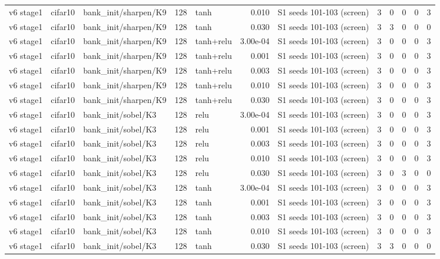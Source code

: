 \begin{table}[htbp]
{\begin{tabular}{@{}lllrlrlrrrrr@{}}
v6 stage1 & cifar10 & bank\_init/sharpen/K9 & 128 & tanh & 0.010 & S1 seeds 101-103 (screen) & 3 & 0 & 0 & 0 & 3 \\
v6 stage1 & cifar10 & bank\_init/sharpen/K9 & 128 & tanh & 0.030 & S1 seeds 101-103 (screen) & 3 & 3 & 0 & 0 & 0 \\
v6 stage1 & cifar10 & bank\_init/sharpen/K9 & 128 & tanh+relu & 3.00e-04 & S1 seeds 101-103 (screen) & 3 & 0 & 0 & 0 & 3 \\
v6 stage1 & cifar10 & bank\_init/sharpen/K9 & 128 & tanh+relu & 0.001 & S1 seeds 101-103 (screen) & 3 & 0 & 0 & 0 & 3 \\
v6 stage1 & cifar10 & bank\_init/sharpen/K9 & 128 & tanh+relu & 0.003 & S1 seeds 101-103 (screen) & 3 & 0 & 0 & 0 & 3 \\
v6 stage1 & cifar10 & bank\_init/sharpen/K9 & 128 & tanh+relu & 0.010 & S1 seeds 101-103 (screen) & 3 & 0 & 0 & 0 & 3 \\
v6 stage1 & cifar10 & bank\_init/sharpen/K9 & 128 & tanh+relu & 0.030 & S1 seeds 101-103 (screen) & 3 & 0 & 0 & 0 & 3 \\
v6 stage1 & cifar10 & bank\_init/sobel/K3 & 128 & relu & 3.00e-04 & S1 seeds 101-103 (screen) & 3 & 0 & 0 & 0 & 3 \\
v6 stage1 & cifar10 & bank\_init/sobel/K3 & 128 & relu & 0.001 & S1 seeds 101-103 (screen) & 3 & 0 & 0 & 0 & 3 \\
v6 stage1 & cifar10 & bank\_init/sobel/K3 & 128 & relu & 0.003 & S1 seeds 101-103 (screen) & 3 & 0 & 0 & 0 & 3 \\
v6 stage1 & cifar10 & bank\_init/sobel/K3 & 128 & relu & 0.010 & S1 seeds 101-103 (screen) & 3 & 0 & 0 & 0 & 3 \\
v6 stage1 & cifar10 & bank\_init/sobel/K3 & 128 & relu & 0.030 & S1 seeds 101-103 (screen) & 3 & 0 & 3 & 0 & 0 \\
v6 stage1 & cifar10 & bank\_init/sobel/K3 & 128 & tanh & 3.00e-04 & S1 seeds 101-103 (screen) & 3 & 0 & 0 & 0 & 3 \\
v6 stage1 & cifar10 & bank\_init/sobel/K3 & 128 & tanh & 0.001 & S1 seeds 101-103 (screen) & 3 & 0 & 0 & 0 & 3 \\
v6 stage1 & cifar10 & bank\_init/sobel/K3 & 128 & tanh & 0.003 & S1 seeds 101-103 (screen) & 3 & 0 & 0 & 0 & 3 \\
v6 stage1 & cifar10 & bank\_init/sobel/K3 & 128 & tanh & 0.010 & S1 seeds 101-103 (screen) & 3 & 0 & 0 & 0 & 3 \\
v6 stage1 & cifar10 & bank\_init/sobel/K3 & 128 & tanh & 0.030 & S1 seeds 101-103 (screen) & 3 & 3 & 0 & 0 & 0 \\

\end{tabular}}
\end{table}

